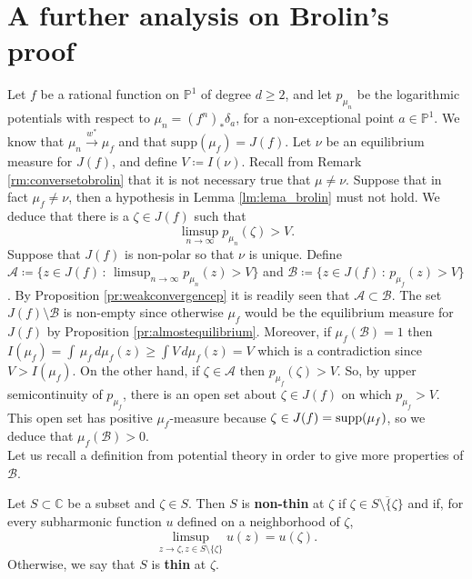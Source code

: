\section{A further analysis on Brolin's proof}\label{conclusion1}

Let $f$ be a rational function on $\mathbb{P}^1$ of degree $d\geq 2$, and let $p_{\mu_n}$ be the logarithmic potentials with respect to $\mu_n=(f^n)_*\delta_a$, for a non-exceptional point $a\in \mathbb{P}^1$. We know that $\mu_n \overset{w^*}{\rightarrow} \mu_f$ and that $\text{supp}(\mu_f)=J(f)$. Let $\nu$ be an equilibrium measure for $J(f)$, and define $V\coloneqq I(\nu)$. Recall from Remark \ref{rm:conversetobrolin} that it is not necessary true that $\mu\neq \nu$. Suppose that in fact $\mu_f\neq \nu$, then a hypothesis in Lemma \ref{lm:lema_brolin} must not hold. We deduce that there is a $\zeta\in J(f)$ such that
\begin{equation}\label{conditionboundary}
\limsup_{n\rightarrow \infty} p_{\mu_n}(\zeta) > V.
\end{equation}
Suppose that $J(f)$ is non-polar so that $\nu$ is unique. Define $\mathcal{A}\coloneqq \{z\in J(f)\,:\, \limsup_{n\rightarrow \infty} p_{\mu_n}(z) > V\}$ and $\mathcal{B} \coloneqq \{z\in J(f)\,:\, p_{\mu_f}(z)> V\}$. By Proposition \ref{pr:weakconvergencep} it is readily seen that $\mathcal{A}\subset \mathcal{B}$. The set $J(f)\setminus \mathcal{B}$ is non-empty since otherwise $\mu_f$ would be the equilibrium measure for $J(f)$ by Proposition \ref{pr:almostequilibrium}. Moreover, if $\mu_f(\mathcal{B})=1$ then $I(\mu_f) = \int \, \mu_f \, d\mu_f(z) \geq \int V \, d\mu_f(z) = V$ which is a contradiction since $V> I(\mu_f)$. On the other hand, if $\zeta \in \mathcal{A}$ then $p_{\mu_f}(\zeta)>V$. So, by upper semicontinuity of $p_{\mu_f}$, there is an open set about $\zeta\in J(f)$ on which $p_{\mu_f}>V$. This open set has positive $\mu_f$-measure because $\zeta\in J(f)=\text{supp}(\mu_f)$, so we deduce that $\mu_f(\mathcal{B})>0$.\\

Let us recall a definition from potential theory in order to give more properties of $\mathcal{B}$.\\

\begin{mydef}{}{}
Let $S\subset \mathbb{C}$ be a subset and $\zeta \in S$. Then $S$ is {\bf non-thin} at $\zeta$ if $\zeta\in \overline{S\setminus \{\zeta\}}$ and if, for every subharmonic function $u$ defined on a neighborhood of $\zeta$,
$$\limsup_{z\rightarrow \zeta, z\in S\setminus \{\zeta\}} u(z) = u(\zeta).$$
Otherwise, we say that $S$ is {\bf thin} at $\zeta$.
\end{mydef}

